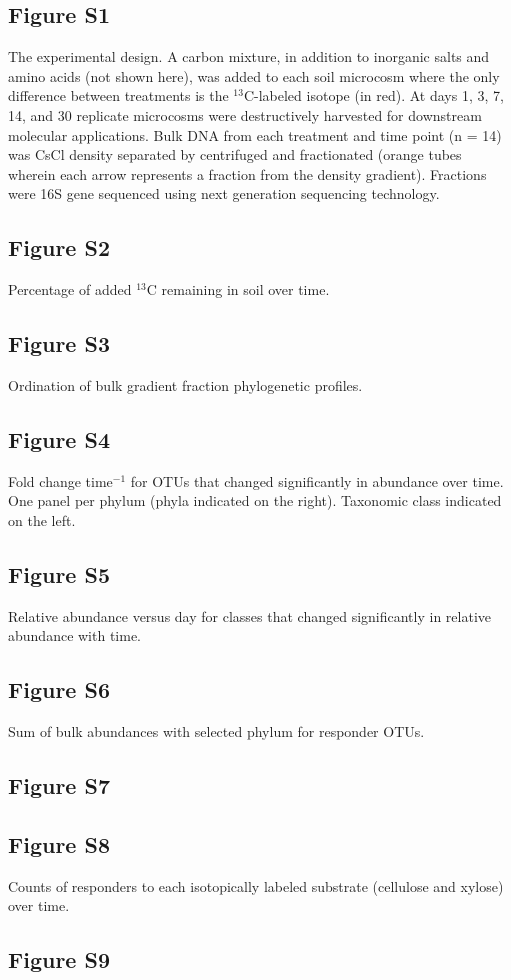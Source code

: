 \subsection{Figure S1}
The experimental design.  A carbon mixture, in addition to inorganic salts and amino acids (not shown here), was added to each soil microcosm where the only difference between treatments is the $^{13}$C-labeled isotope (in red). At days 1, 3, 7, 14, and 30 replicate microcosms were destructively harvested for downstream molecular applications. Bulk DNA from each treatment and time point (n = 14) was CsCl density separated by centrifuged and fractionated (orange tubes wherein each arrow represents a fraction from the density gradient). Fractions were 16S gene sequenced using next generation sequencing technology.\subsection{Figure S2}
Percentage of added $^{13}$C remaining in soil over time.     \subsection{Figure S3}
Ordination of bulk gradient fraction phylogenetic profiles.\subsection{Figure S4}
Fold change time$^{-1}$ for OTUs that changed significantly in abundance over time. One panel per phylum (phyla indicated on the right). Taxonomic class indicated on the left.\subsection{Figure S5}
Relative abundance versus day for classes that changed significantly in relative abundance with time.\subsection{Figure S6}
Sum of bulk abundances with selected phylum for responder OTUs.
    \subsection{Figure S7}
\subsection{Figure S8}
Counts of responders to each isotopically labeled substrate (cellulose and xylose) over time.\subsection{Figure S9}
